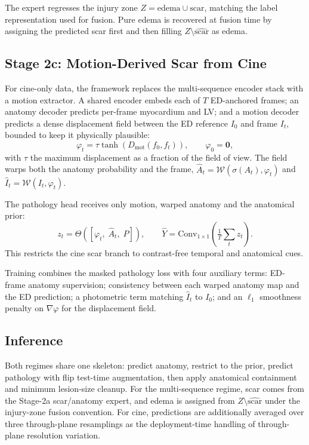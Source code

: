 \documentclass[runningheads]{llncs}
\newcommand{\warp}{\mathcal{W}}
\begin{document}
The expert regresses the injury zone $Z=\text{edema}\cup\text{scar}$, matching
the label representation used for fusion. Pure edema is recovered at fusion time
by assigning the predicted scar first and then filling
$Z\setminus\widehat{\text{scar}}$ as edema.

\subsection{Stage 2c: Motion-Derived Scar from Cine}

For cine-only data, the framework replaces the multi-sequence encoder stack with a
motion extractor. A shared encoder embeds each of $T$ ED-anchored frames; an
anatomy decoder predicts per-frame myocardium and LV; and a motion decoder
predicts a dense displacement field between the ED reference $I_0$ and frame
$I_t$, bounded to keep it physically plausible:
\begin{equation}
\varphi_t=\tau\tanh\!\left(D_{\text{mot}}(f_0,f_t)\right),\qquad \varphi_0=\mathbf{0},
\end{equation}
with $\tau$ the maximum displacement as a fraction of the field of view. The
field warps both the anatomy probability and the frame,
$\hat{A}_t=\warp(\sigma(A_t),\varphi_t)$ and $\hat{I}_t=\warp(I_t,\varphi_t)$.

The pathology head receives only motion, warped anatomy and the anatomical prior:
\begin{equation}
z_t=\Theta\!\left(\left[\varphi_t,\;\hat{A}_t,\;P\right]\right),
\qquad
\hat{Y}=\mathrm{Conv}_{1\times1}\!\left(\tfrac{1}{T}\textstyle\sum_{t} z_t\right).
\label{eq:cinehead}
\end{equation}
This restricts the cine scar branch to contrast-free temporal and anatomical
cues.

Training combines the masked pathology loss with four auxiliary terms: ED-frame
anatomy supervision; consistency between each warped anatomy map and the ED
prediction; a photometric term matching $\hat{I}_t$ to $I_0$; and an $\ell_1$
smoothness penalty on $\nabla\varphi$ for the displacement field.

\subsection{Inference}

Both regimes share one skeleton: predict anatomy, restrict to the prior, predict
pathology with flip test-time augmentation, then apply anatomical containment and
minimum lesion-size cleanup.
For the multi-sequence regime, scar comes from the Stage-2a scar/anatomy expert,
and edema is assigned from $Z\setminus\widehat{\text{scar}}$ under the injury-zone
fusion convention. For cine, predictions are additionally averaged over three
through-plane resamplings as the deployment-time handling of through-plane
resolution variation.
\end{document}
